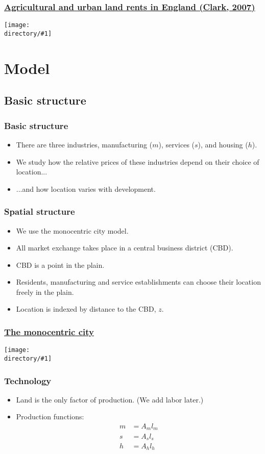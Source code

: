 \documentclass[handout,compress,mathserif]{beamer}
\newcommand{\directory}{figures}
\newcommand{\widefigure}[2]{\begin{frame}\frametitle{\hyperlink{#1back}{#2}}\hypertarget{#1}{{\begin{center}\texttt{[image: \\directory/\#1]}\end{center}}}\end{frame}}
\begin{document}
\widefigure{clark-landrents}{Agricultural and urban land rents in England (Clark, 2007)}



\section{Model}
\subsection{Basic structure}
\begin{frame}\frametitle{Basic structure}
\begin{itemize}
    \item There are three industries, manufacturing ($m$), services ($s$), and housing ($h$).
    \item We study how the relative prices of these industries depend on their choice of location...
	\item ...and how location varies with development.
\end{itemize}
\end{frame}

\begin{frame}\frametitle{Spatial structure}
\begin{itemize}
    \item We use the monocentric city model.
	\item All market exchange takes place in a central business district (CBD).
	\item CBD is a point in the plain.
	\item Residents, manufacturing and service establishments can choose their location freely in the plain.
	\item Location is indexed by distance to the CBD, $z$.
\end{itemize}
\end{frame}

\widefigure{monocentric-1}{The monocentric city}

\begin{frame}\frametitle{Technology}
\begin{itemize}
    \item Land is the only factor of production. (We add labor later.)
	\item Production functions:
\begin{align*}
m&=A_ml_m\\
s&=A_sl_s\\
h&= A_hl_h
\end{align*}
\end{itemize}
\end{frame}
\end{document}

